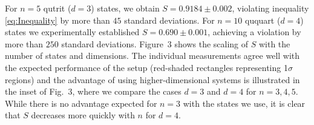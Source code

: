 \documentclass[aps,prl,floatfix,twocolumn,tightenlines,amsmath,amssymb,nofootinbib]{revtex4-1}
\begin{document}
For $n{=}5$ qutrit ($d{=}3$) states, we obtain $S{=}0.9184\pm 0.002$, violating inequality \eqref{eq:Inequality} by more than $45$ standard deviations.
For $n{=}10$ ququart ($d{=}4$) states we experimentally established $S=0.690\pm0.001$, achieving a violation by more than $250$ standard deviations.
Figure~3 shows the scaling of $S$ with the number of states and dimensions. The individual measurements agree well with the expected performance of the setup (red-shaded rectangles representing 1$\sigma$ regions) and the advantage of using higher-dimensional systems is illustrated in the inset of Fig.~3, where we compare the cases $d{=}3$ and $d{=}4$ for $n{=}3,4,5$. While there is no advantage expected for $n{=}3$ with the states we use\cite{Branciard2014a}, it is clear that $S$ decreases more quickly with $n$ for $d{=}4$.
\end{document}
